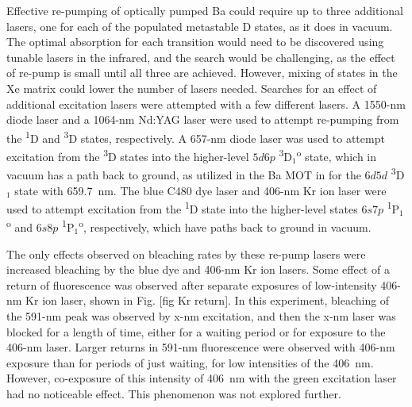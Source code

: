Effective re-pumping of optically pumped Ba could require up to three additional lasers, one for each of the populated metastable D states, as it does in vacuum.  The optimal absorption for each transition would need to be discovered using tunable lasers in the infrared, and the search would be challenging, as the effect of re-pump is small until all three are achieved.  However, mixing of states in the Xe matrix could lower the number of lasers needed.  Searches for an effect of additional excitation lasers were attempted with a few different lasers.  A 1550-nm diode laser and a 1064-nm Nd:YAG laser were used to attempt re-pumping from the \textsuperscript{1}D and \textsuperscript{3}D states, respectively.  A 657-nm diode laser was used to attempt excitation from the \textsuperscript{3}D states into the higher-level $5d6p$ \textsuperscript{3}D$_{1}$\textsuperscript{o} state, which in vacuum has a path back to ground, as utilized in the Ba MOT in \cite{BaMOT} for the $6d5d$ \textsuperscript{3}D$_{1}$ state with 659.7~nm.  The blue C480 dye laser and 406-nm Kr ion laser were used to attempt excitation from the \textsuperscript{1}D state into the higher-level states $6s7p$ \textsuperscript{1}P$_{1}$\textsuperscript{o} and $6s8p$ \textsuperscript{1}P$_{1}$\textsuperscript{o}, respectively, which have paths back to ground in vacuum.

The only effects observed on bleaching rates by these re-pump lasers were increased bleaching by the blue dye and 406-nm Kr ion lasers.  Some effect of a return of fluorescence was observed after separate exposures of low-intensity 406-nm Kr ion laser, shown in Fig. [fig Kr return].  In this experiment, bleaching of the 591-nm peak was observed by x-nm excitation, and then the x-nm laser was blocked for a length of time, either for a waiting period or for exposure to the 406-nm laser.  Larger returns in 591-nm fluorescence were observed with 406-nm exposure than for periods of just waiting, for low intensities of the 406~nm.  However, co-exposure of this intensity of 406~nm with the green excitation laser had no noticeable effect.  This phenomenon was not explored further.


